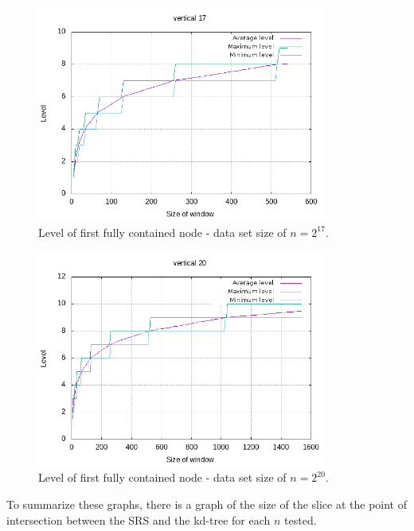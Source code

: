 \begin{figure}[h]
    \centering
    \includegraphics[width = 0.85\textwidth]{pictures/analysis/level_vert_17.png}
    \caption{Level of first fully contained node - data set size of $n=2^{17}$.}\label{fig:level_vert_17}
\end{figure}

\begin{figure}[h]
    \centering
    \includegraphics[width = 0.85\textwidth]{pictures/analysis/level_vert_20.png}
    \caption{Level of first fully contained node - data set size of $n=2^{20}$.}\label{fig:level_vert_20}
\end{figure}


To summarize these graphs, there is a graph of the size of the slice at the point of intersection between the SRS and the kd-tree for each $n$ tested.

